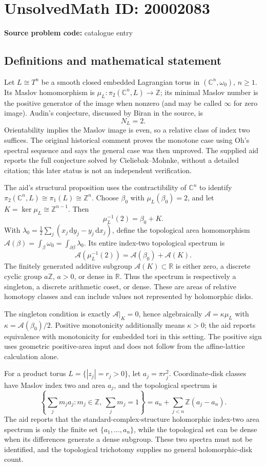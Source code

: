 \documentclass[11pt]{article}
\newcommand{\Z}{\mathbb{Z}}
\newcommand{\R}{\mathbb{R}}
\newcommand{\C}{\mathbb{C}}
\newcommand{\dd}{\,\mathrm{d}}
\begin{document}
\section*{UnsolvedMath ID: 20002083}
\textbf{Source problem code:} catalogue entry
\subsection{Definitions and mathematical statement}
Let \(L\cong T^n\) be a smooth closed embedded Lagrangian torus in \((\C^n,\omega_0)\), \(n\geq1\). Its Maslov homomorphism is \(\mu_L:\pi_2(\C^n,L)\to\Z\); its minimal Maslov number is the positive generator of the image when nonzero (and may be called \(\infty\) for zero image). Audin's conjecture, discussed by Biran in the source, is
\[
N_L=2.
\]
Orientability implies the Maslov image is even, so a relative class of index two suffices. The original historical comment proves the monotone case using Oh's spectral sequence and says the general case was then unproved. The supplied aid reports the full conjecture solved by Cieliebak--Mohnke, without a detailed citation; this later status is not an independent verification.

The aid's structural proposition uses the contractibility of \(\C^n\) to identify \(\pi_2(\C^n,L)\cong\pi_1(L)\cong\Z^n\). Choose \(\beta_0\) with \(\mu_L(\beta_0)=2\), and let \(K=\ker\mu_L\cong\Z^{n-1}\). Then
\[
\mu_L^{-1}(2)=\beta_0+K.
\]
With \(\lambda_0=\tfrac12\sum_j(x_j\dd y_j-y_j\dd x_j)\), define the topological area homomorphism \(\mathcal A(\beta)=\int_\beta\omega_0=\int_{\partial\beta}\lambda_0\). Its entire index-two topological spectrum is
\[
\mathcal A(\mu_L^{-1}(2))=\mathcal A(\beta_0)+\mathcal A(K).
\]
The finitely generated additive subgroup \(\mathcal A(K)\subset\R\) is either zero, a discrete cyclic group \(a\Z\), \(a>0\), or dense in \(\R\). Thus the spectrum is respectively a singleton, a discrete arithmetic coset, or dense. These are areas of relative homotopy classes and can include values not represented by holomorphic disks.

The singleton condition is exactly \(\mathcal A|_K=0\), hence algebraically \(\mathcal A=\kappa\mu_L\) with \(\kappa=\mathcal A(\beta_0)/2\). Positive monotonicity additionally means \(\kappa>0\); the aid reports equivalence with monotonicity for embedded tori in this setting. The positive sign uses geometric positive-area input and does not follow from the affine-lattice calculation alone.

For a product torus \(L=\{|z_j|=r_j>0\}\), let \(a_j=\pi r_j^2\). Coordinate-disk classes have Maslov index two and area \(a_j\), and the topological spectrum is
\[
\left\{\sum_jm_ja_j:m_j\in\Z,\ \sum_jm_j=1\right\}
=a_n+\sum_{j<n}\Z(a_j-a_n).
\]
The aid reports that the standard-complex-structure holomorphic index-two area spectrum is only the finite set \(\{a_1,\ldots,a_n\}\), while the topological set can be dense when its differences generate a dense subgroup. These two spectra must not be identified, and the topological trichotomy supplies no general holomorphic-disk count.
\end{document}
